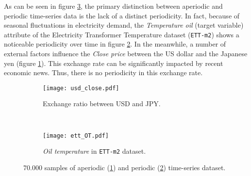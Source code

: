 
As can be seen in figure \ref{fig:ill_aperiodic}, the primary distinction between aperiodic and periodic time-series data is the lack of a distinct periodicity. In fact, because of seasonal fluctuations in electricity demand, the \textit{Temperature oil} (target variable) attribute of the Electricity Transformer Temperature dataset (\verb|ETT-m2|) \cite{zhou2021informer} shows a noticeable periodicity over time in figure \ref{fig:periodic}. In the meanwhile, a number of external factors influence the \textit{Close price} between the US dollar and the Japanese yen (figure \ref{fig:aperiodic}). This exchange rate can be significantly impacted by recent economic news. Thus, there is no periodicity in this exchange rate.

\begin{figure}[H]
    \centering
    \begin{subfigure}[b]{0.5\textwidth}
        \centering
        \texttt{[image: usd\_close.pdf]}
        \caption{Exchange ratio between USD and JPY.}
        \label{fig:aperiodic}
    \end{subfigure}%
    ~
    \begin{subfigure}[b]{0.5\textwidth}
        \centering
        \texttt{[image: ett\_OT.pdf]}
        \cprotect\caption{\textit{Oil temperature} in \verb|ETT-m2| dataset.}
        \label{fig:periodic}
    \end{subfigure}

    \caption{70.000 samples of aperiodic (\ref{fig:aperiodic}) and periodic (\ref{fig:periodic}) time-series dataset.}
    \label{fig:ill_aperiodic}
\end{figure}


